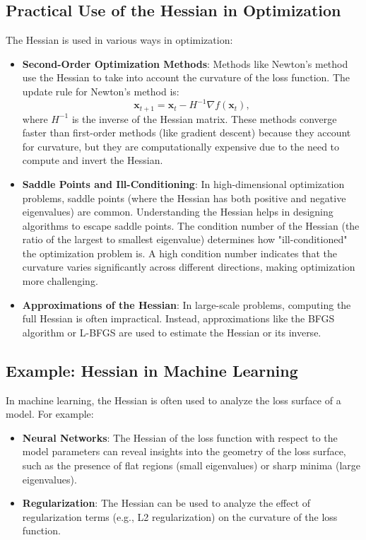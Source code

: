 \begin{notechapter}
\subsection{Practical Use of the Hessian in Optimization}
The Hessian is used in various ways in optimization:
\begin{itemize}
    \item \textbf{Second-Order Optimization Methods}: Methods 
          like Newton's method use the Hessian to take into 
          account the curvature of the loss function. The update 
          rule for Newton's method is:
          \[
          \mathbf{x}_{t+1} = \mathbf{x}_t - H^{-1} \nabla f(\mathbf{x}_t),
          \]
          where \( H^{-1} \) is the inverse of the Hessian matrix. 
          These methods converge faster than first-order methods 
          (like gradient descent) because they account for 
          curvature, but they are computationally expensive due 
          to the need to compute and invert the Hessian.

    \item \textbf{Saddle Points and Ill-Conditioning}: In 
          high-dimensional optimization problems, saddle points 
          (where the Hessian has both positive and negative 
          eigenvalues) are common. Understanding the Hessian 
          helps in designing algorithms to escape saddle points. 
          The condition number of the Hessian (the ratio of the 
          largest to smallest eigenvalue) determines how 
          "ill-conditioned" the optimization problem is. A high 
          condition number indicates that the curvature varies 
          significantly across different directions, making 
          optimization more challenging.

    \item \textbf{Approximations of the Hessian}: In large-scale 
          problems, computing the full Hessian is often impractical. 
          Instead, approximations like the BFGS algorithm or 
          L-BFGS are used to estimate the Hessian or its inverse.
\end{itemize}

\subsection{Example: Hessian in Machine Learning}
In machine learning, the Hessian is often used to analyze the 
loss surface of a model. For example:
\begin{itemize}
    \item \textbf{Neural Networks}: The Hessian of the loss 
          function with respect to the model parameters can 
          reveal insights into the geometry of the loss surface, 
          such as the presence of flat regions (small eigenvalues) 
          or sharp minima (large eigenvalues).
    \item \textbf{Regularization}: The Hessian can be used to 
          analyze the effect of regularization terms (e.g., L2 
          regularization) on the curvature of the loss function.
\end{itemize}


\end{notechapter}
